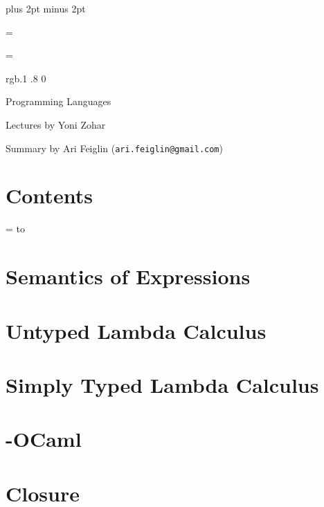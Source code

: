 


\parindent=0pt
\parskip=3pt plus 2pt minus 2pt



\footline={}


\headline={}

\color rgb{.1 .8 0}

{\def\boxshadowcolor{rgb{.2 .9 .2}}

    \centerline{Programming Languages}
    \smallskip
    \centerline{Lectures by Yoni Zohar}
    \centerline{Summary by Ari Feiglin ({\tt ari.feiglin@gmail.com})}

\eppbox

\bigskip

\section*{Contents}

\tableofcontents
\eppbox

}

\vfill\break

\color{black}

\newif\ifpageodd
\pageoddtrue
\headline={%
    \hbox to \hsize{\color{black}%
        \ifpageodd\hfil{\it\currsubsection\quad\bf\folio}\global\pageoddfalse%
        \else{\bf\folio\quad\it\currsubsection}\hfil\global\pageoddtrue\fi%
    }%
}

\section{Semantics of Expressions}



\vfill\break

\section{Untyped Lambda Calculus}



\vfill\break

\section{Simply Typed Lambda Calculus}



\vfill\break

\section{\lambda-OCaml}



\section{Closure}



\bye

